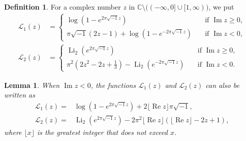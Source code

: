 \documentclass[a4paper,dvipdfmx]{amsart}
\theoremstyle{plain}
\newtheorem{lem}[thm]{Lemma}
\theoremstyle{definition}
\newtheorem{defn}[thm]{Definition}
\theoremstyle{remark}
\newcommand{\C}{\mathbb{C}}
\newcommand{\Li}{\operatorname{Li}}
\renewcommand{\L}{\mathcal{L}}
\newcommand{\floor}[1]{\lfloor#1\rfloor}
\renewcommand{\Re}{\operatorname{Re}}
\renewcommand{\Im}{\operatorname{Im}}
\renewcommand{\i}{\sqrt{-1}}
\numberwithin{equation}{section}
\begin{document}
\begin{defn}\label{defn:L1_L2}
For a complex number $z$ in $\C\setminus\bigl((-\infty,0]\cup[1,\infty)\bigr)$, we put
\begin{align}
  \L_1(z)
  &=
  \begin{cases}
    \log\left(1-e^{2\pi\i z}\right)&\quad\text{if $\Im{z}\ge0$},
    \\
    \pi\i(2z-1)+\log\left(1-e^{-2\pi\i z}\right)&\quad\text{if $\Im{z}<0$},
  \end{cases}
  \label{eq:L1_log}
  \\
  \L_2(z)
  &=
  \begin{cases}
    \Li_2\left(e^{2\pi\i z}\right)&\quad\text{if $\Im{z}\ge0$},
    \\
    \pi^2\left(2z^2-2z+\frac{1}{3}\right)-\Li_2\left(e^{-2\pi\i z}\right)
    &\quad\text{if $\Im{z}<0$}.
  \end{cases}
  \label{eq:L2_dilog}
\end{align}
\end{defn}
\begin{lem}\label{lem:L2_Li2}
When $\Im{z}<0$, the functions $\L_1(z)$ and $\L_2(z)$ can also be written as
\begin{align*}
  \L_1(z)
  =&
  \log\left(1-e^{2\pi\i z}\right)+2\floor{\Re{z}}\pi\i,
  \\
  \L_2(z)
  =&
  \Li_2\left(e^{2\pi\i z}\right)
  -2\pi^2\floor{\Re{z}}\left(\floor{\Re{z}}-2z+1\right),
\end{align*}
where $\floor{x}$ is the greatest integer that does not exceed $x$.
\end{lem}
\end{document}
